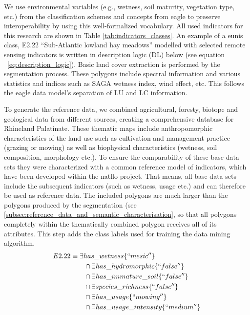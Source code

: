 \documentclass[authoryear,preprint,12pt,number]{elsarticle}
\begin{document}
We use environmental variables (e.g., wetness, soil maturity, vegetation type,
etc.) from the classification schemes and concepts from \gls{eagle} to preserve
interoperability by using this well-formalized vocabulary. All used indicators
for this research are shown in Table \ref{tab:indicators_classes}. An example of
a \gls{eunis} class, E2.22 ``Sub-Atlantic lowland hay meadows'' modelled with 
selected
remote sensing indicators is written in description logic (DL) below (see
equation ~\ref{eq:description_logic}). Basic land cover extraction is performed
by the segmentation process. 
These polygons include spectral information and various statistics and indices
such as SAGA wetness index, wind effect, etc. This follows the \gls{eagle} data
model's separation of LU and LC information.

To generate the reference data, we combined agricultural, foresty, biotope and 
geological data from different sources, creating a comprehensive database for 
Rhineland Palatinate. These thematic maps include anthropomorphic 
characteristics of the land use such as cultivation and management practice 
(grazing or mowing) as well as biophysical characteristics (wetness, soil 
composition, morphology etc.). To ensure the comparability of these base data 
sets they were characterized with a common reference model of indicators, which 
have been developed within the \gls{natflo} project. That means, all base data 
sets include the subsequent indicators (such as wetness, usage etc.) and can 
therefore be used as reference data. The included polygons are much larger than 
the polygons produced by the segmentation (see 
\ref{subsec:reference_data_and_semantic_characterisation}, so that all polygons 
completely within the thematically combined polygon receives all of its 
attributes. This step adds the class labels used for training the data mining 
algorithm.
\begin{equation}\label{eq:description_logic}
\begin{align*}
    E2.22 &\equiv \exists has\_wetness \{``mesic''\} \\
    &\qquad {} \cap \exists has\_hydromorphic \{``false''\} \\
    &\qquad {} \cap \exists has\_immature\_soil \{``false''\} \\
    &\qquad {} \cap \exists species\_richness \{``false''\} \\
    &\qquad {} \cap \exists has\_usage \{``mowing''\} \\
    &\qquad {} \cap \exists has\_usage\_intensity \{``medium''\} \\
\end{align*}
\end{equation}
\label{subsec:Selection_of_training_validation_data}
\end{document}
